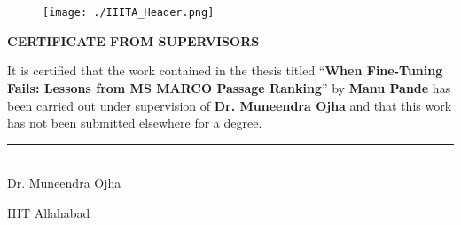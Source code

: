 \begin{spacing}{2.0}
\begin{flushright}
\begin{minipage}{0.5\textwidth}
\begin{spacing}{2.0}
\begin{flushright}
    \begin{minipage}{0.5\textwidth}
        \flushright \vspace{60 pt}
        \underline{\hspace{6cm}} \\
         \\[80pt]
    \end{minipage}
\end{flushright}
\end{spacing}
\newpage

\checktoopen
\begin{figure}[htp]
    \texttt{[image: ./IIITA\_Header.png]}
\end{figure}
\thispagestyle{empty}
\vspace*{.06\textheight}

\begin{spacing}{1.5}
\begin{center}
    {\centering\large\bfseries CERTIFICATE FROM SUPERVISORS\par\vspace{10pt}}
\end{center}

\noindent It is certified that the work contained in the thesis titled \enquote{\textbf{When Fine-Tuning Fails: Lessons from MS MARCO Passage Ranking}} by \textbf{Manu Pande} has been carried out under supervision of \textbf{Dr. Muneendra Ojha} and that this work has not been submitted elsewhere for a degree.

\vspace{3.5cm}

\hfill\begin{minipage}{7.5cm}
    \begin{spacing}{1.2}
        \par
        \rule{\textwidth}{0.2pt}\\
        {Dr. Muneendra Ojha} \par
        {\deptname}  \par
        IIIT Allahabad \par
    \end{spacing}
\end{minipage}



\end{spacing}
\end{minipage}
\end{flushright}
\end{spacing}
